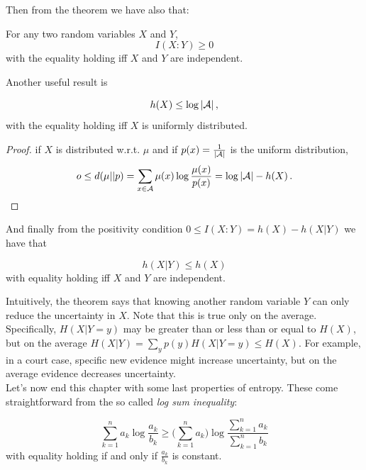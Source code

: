 Then from the theorem we have also that:
\begin{corollary}
    For any two random variables $X$ and $Y$,
    \begin{equation}
        I(X:Y) \geq 0
    \end{equation}
    with the equality holding iff $X$ and $Y$ are independent. 
\end{corollary}
Another useful result is
\begin{theorem}
    \begin{equation}
        h(X) \leq \log |\mathcal{A}| \, ,
    \end{equation}
    with the equality holding iff $X$ is uniformly distributed.
\end{theorem}
\begin{proof}
    if $X$ is distributed w.r.t. $\mu$ and if $p(x)= \frac{1}{|\mathcal{A}|}$ is the uniform distribution,
    \begin{equation*}
        o \leq d(\mu || p) = \sum_{x \in \mathcal{A}} \mu(x) \log \frac{\mu(x)}{p(x)} = \log |\mathcal{A}| - h(X) \, .
    \end{equation*}
\end{proof}
And finally from the positivity condition $0 \leq I(X:Y) = h(X) - h(X|Y)$ we have that
\begin{theorem}
    \begin{equation}
        h(X|Y) \leq h(X)
    \end{equation}
    with equality holding iff $X$ and $Y$ are independent.
\end{theorem}
Intuitively, the theorem says that knowing another random variable $Y$ can only reduce the uncertainty in $X$. Note that this is true only on the
average. Specifically, $H (X|Y = y)$ may be greater than or less than or equal to $H (X)$, but on the average $H (X|Y ) =\sum_y p(y)H (X|Y = y) \leq H (X)$. For example, in a court case, specific new evidence might increase uncertainty, but on the average evidence decreases uncertainty.
\\Let's now end this chapter with some last properties of entropy. These come straightforward from the so called \textit{log sum inequality}:
\begin{theorem}
    \begin{equation}
            \sum_{k=1}^n a_k \log \frac{a_k}{b_k} \geq \big( \sum_{k=1}^n a_k \big) \log \frac{\sum_{k=1}^n a_k}{\sum_{k=1}^n b_k}   
    \end{equation}
    with equality holding if and only if $\frac{a_k}{b_k}$ is constant. 
\end{theorem}
